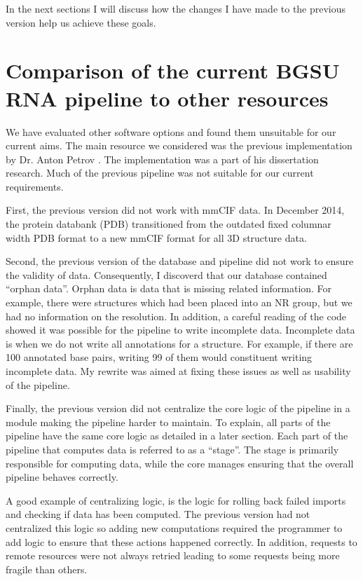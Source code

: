 In the next sections I will discuss how the changes I have made to the previous
version help us achieve these goals.

\section{Comparison of the current BGSU RNA pipeline to other resources}

We have evaluated other software options and found them unsuitable for our
current aims. The main resource we considered was the previous implementation by
Dr. Anton Petrov \cite{Petrov2012}. The implementation was a part of his dissertation research.
Much of the previous pipeline was not suitable for our current requirements.

First, the previous version did not work with mmCIF data. In December 2014, the
protein databank (PDB) transitioned from the outdated fixed columnar width  PDB
format to a new mmCIF format for all 3D structure data.

Second, the previous version of the database and pipeline did not work to ensure
the validity of data. Consequently, I discoverd that our database contained
``orphan data''. Orphan data is data that is missing related information. For
example, there were structures which had been placed into an NR group, but we
had no information on the resolution. In addition, a careful reading of the code
showed it was possible for the pipeline to write incomplete data. Incomplete
data is when we do not write all annotations for a structure. For example, if
there are 100 annotated base pairs, writing 99 of them would constituent writing
incomplete data. My rewrite was aimed at fixing these issues as well as
usability of the pipeline.

Finally, the previous version did not centralize the core logic of the pipeline
in a module making the pipeline harder to maintain. To explain, all parts of the
pipeline have the same core logic as detailed in a later section. Each part of
the pipeline that computes data is referred to as a ``stage''. The stage is
primarily responsible for computing data, while the core manages ensuring that
the overall pipeline behaves correctly.

A good example of centralizing logic, is the logic for rolling back failed
imports and checking if data has been computed. The previous version had not
centralized this logic so adding new computations required the programmer to add
logic to ensure that these actions happened correctly. In addition, requests to
remote resources were not always retried leading to some requests being more
fragile than others.

